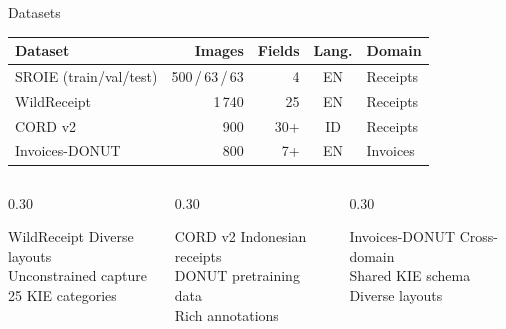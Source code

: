 \documentclass[aspectratio=169,11pt]{beamer}
\begin{document}
\begin{frame}{Datasets}
  \centering
  \begin{tabular}{@{}lrrcl@{}}
    \toprule
    \textbf{Dataset} & \textbf{Images} & \textbf{Fields} &
    \textbf{Lang.} & \textbf{Domain} \\
    \midrule
    SROIE (train/val/test) & 500\,/\,63\,/\,63 & 4 & EN & Receipts \\
    WildReceipt      & 1\,740   & 25  & EN & Receipts \\
    CORD v2          & 900      & 30+ & ID & Receipts \\
    Invoices-DONUT   & 800      & 7+  & EN & Invoices \\
    \bottomrule
  \end{tabular}

  \vspace{0.5cm}

  \begin{columns}[T]
    \begin{column}{0.30\textwidth}
      \begin{block}{\centering WildReceipt}
        \centering
        Diverse layouts\\
        Unconstrained capture\\
        25 KIE categories
      \end{block}
    \end{column}
    \begin{column}{0.30\textwidth}
      \begin{block}{\centering CORD v2}
        \centering
        Indonesian receipts\\
        DONUT pretraining data\\
        Rich annotations
      \end{block}
    \end{column}
    \begin{column}{0.30\textwidth}
      \begin{block}{\centering Invoices-DONUT}
        \centering
        Cross-domain\\
        Shared KIE schema\\
        Diverse layouts
      \end{block}
    \end{column}
  \end{columns}
\end{frame}
\end{document}
